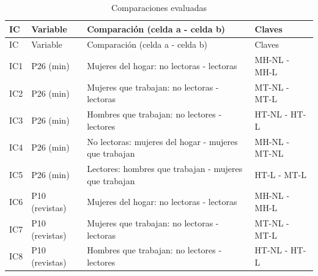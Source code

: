 \documentclass[
  spanish,
  11pt,
]{extarticle}
\begin{document}
\begin{longtable}[]{@{}
  >{\raggedright\arraybackslash}p{}
  >{\raggedright\arraybackslash}p{}
  >{\raggedright\arraybackslash}p{}
  >{\raggedright\arraybackslash}p{}@{}}
\caption{Comparaciones evaluadas}\tabularnewline
\toprule\noalign{}
\begin{minipage}[b]{\linewidth}\raggedright
IC
\end{minipage} & \begin{minipage}[b]{\linewidth}\raggedright
Variable
\end{minipage} & \begin{minipage}[b]{\linewidth}\raggedright
Comparación (celda a - celda b)
\end{minipage} & \begin{minipage}[b]{\linewidth}\raggedright
Claves
\end{minipage} \\
\midrule\noalign{}
\endfirsthead
\toprule\noalign{}
\begin{minipage}[b]{\linewidth}\raggedright
IC
\end{minipage} & \begin{minipage}[b]{\linewidth}\raggedright
Variable
\end{minipage} & \begin{minipage}[b]{\linewidth}\raggedright
Comparación (celda a - celda b)
\end{minipage} & \begin{minipage}[b]{\linewidth}\raggedright
Claves
\end{minipage} \\
\midrule\noalign{}
\endhead
\bottomrule\noalign{}
\endlastfoot
IC1 & P26 (min) & Mujeres del hogar: no lectoras - lectoras & MH-NL -
MH-L \\
IC2 & P26 (min) & Mujeres que trabajan: no lectoras - lectoras & MT-NL -
MT-L \\
IC3 & P26 (min) & Hombres que trabajan: no lectores - lectores & HT-NL -
HT-L \\
IC4 & P26 (min) & No lectoras: mujeres del hogar - mujeres que trabajan
& MH-NL - MT-NL \\
IC5 & P26 (min) & Lectores: hombres que trabajan - mujeres que trabajan
& HT-L - MT-L \\
IC6 & P10 (revistas) & Mujeres del hogar: no lectoras - lectoras & MH-NL
- MH-L \\
IC7 & P10 (revistas) & Mujeres que trabajan: no lectoras - lectoras &
MT-NL - MT-L \\
IC8 & P10 (revistas) & Hombres que trabajan: no lectores - lectores &
HT-NL - HT-L \\
\end{longtable}
\end{document}

